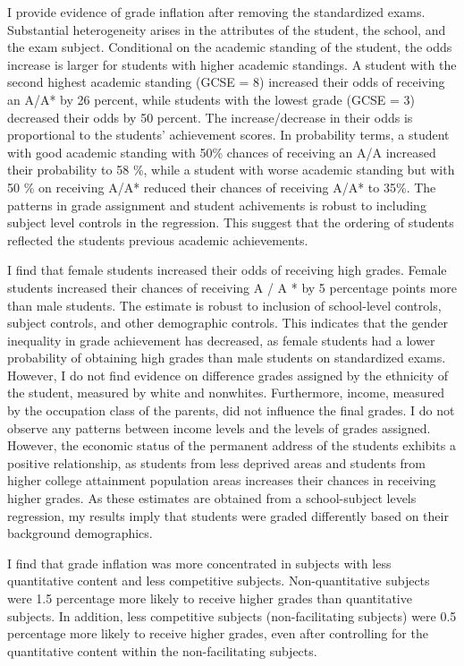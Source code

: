 I provide evidence of grade inflation after removing the standardized exams. Substantial heterogeneity arises in the attributes of the student, the school, and the exam subject. Conditional on the academic standing of the student, the odds increase is larger for students with higher academic standings. A student with the second highest academic standing (GCSE = 8) increased their odds of receiving an A/A* by 26 percent, while students with the lowest grade (GCSE = 3) decreased their odds by 50 percent. The increase/decrease in their odds is proportional to the students' achievement scores. In probability terms, a student with good academic standing with 50\% chances of receiving an A/A increased their probability to 58 \%, while a student with worse academic standing but with 50 \% on receiving A/A* reduced their chances of receiving A/A* to 35\%. The patterns in grade assignment and student achivements is robust to including subject level controls in the regression. This suggest that the ordering of students reflected the students previous academic achievements.

I find that female students increased their odds of receiving high grades. Female students increased their chances of receiving A / A * by 5 percentage points more than male students. The estimate is robust to inclusion of school-level controls, subject controls, and other demographic controls. This indicates that the gender inequality in grade achievement has decreased, as female students had a lower probability of obtaining high grades than male students on standardized exams. However, I do not find evidence on difference grades assigned by the ethnicity of the student, measured by white and nonwhites. Furthermore, income, measured by the occupation class of the parents, did not influence the final grades. I do not observe any patterns between income levels and the levels of grades assigned. However, the economic status of the permanent address of the students exhibits a positive relationship, as students from less deprived areas and students from higher college attainment population areas increases their chances in receiving higher grades. As these estimates are obtained from a school-subject levels regression, my results imply that students were graded differently based on their background demographics. 

I find that grade inflation was more concentrated in subjects with less quantitative content and less competitive subjects. Non-quantitative subjects were 1.5 percentage more likely to receive higher grades than quantitative subjects. In addition, less competitive subjects (non-facilitating subjects) were 0.5 percentage more likely to receive higher grades, even after controlling for the quantitative content within the non-facilitating subjects. 

